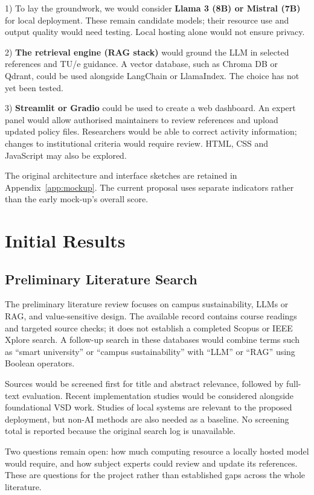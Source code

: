 1) To lay the groundwork, we would consider \textbf{Llama 3 (8B) or Mistral (7B)} for local deployment. These remain candidate models; their resource use and output quality would need testing. Local hosting alone would not ensure privacy.

2) \textbf{The retrieval engine (RAG stack)} would ground the LLM in selected references and TU/e guidance. A vector database, such as Chroma DB or Qdrant, could be used alongside LangChain or LlamaIndex. The choice has not yet been tested.

3) \textbf{Streamlit or Gradio} could be used to create a web dashboard. An expert panel would allow authorised maintainers to review references and upload updated policy files. Researchers would be able to correct activity information; changes to institutional criteria would require review. HTML, CSS and JavaScript may also be explored.

The original architecture and interface sketches are retained in Appendix~\ref{app:mockup}. The current proposal uses separate indicators rather than the early mock-up's overall score.

\clearpage
\section{Initial Results}

\subsection{Preliminary Literature Search}

The preliminary literature review focuses on campus sustainability, LLMs or RAG, and value-sensitive design. The available record contains course readings and targeted source checks; it does not establish a completed Scopus or IEEE Xplore search. A follow-up search in these databases would combine terms such as ``smart university'' or ``campus sustainability'' with ``LLM'' or ``RAG'' using Boolean operators.

Sources would be screened first for title and abstract relevance, followed by full-text evaluation. Recent implementation studies would be considered alongside foundational VSD work. Studies of local systems are relevant to the proposed deployment, but non-AI methods are also needed as a baseline. No screening total is reported because the original search log is unavailable.

Two questions remain open: how much computing resource a locally hosted model would require, and how subject experts could review and update its references. These are questions for the project rather than established gaps across the whole literature.

